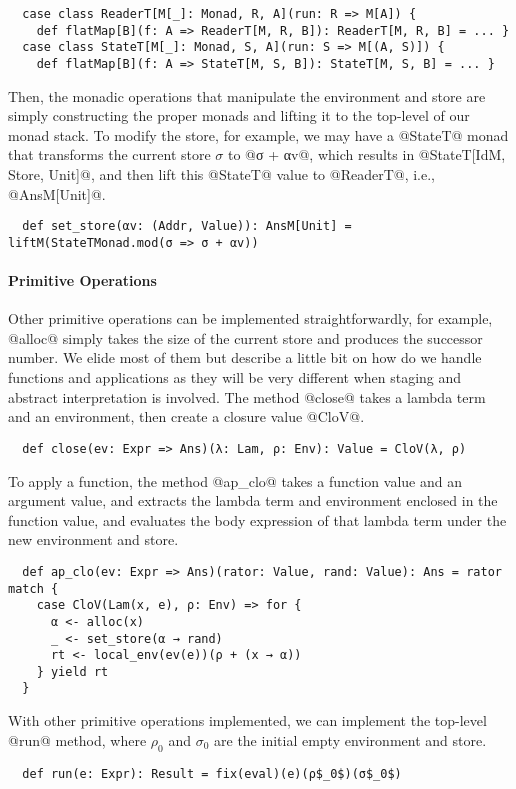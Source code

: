 \begin{lstlisting}
  case class ReaderT[M[_]: Monad, R, A](run: R => M[A]) {
    def flatMap[B](f: A => ReaderT[M, R, B]): ReaderT[M, R, B] = ... }
  case class StateT[M[_]: Monad, S, A](run: S => M[(A, S)]) {
    def flatMap[B](f: A => StateT[M, S, B]): StateT[M, S, B] = ... }
\end{lstlisting}

Then, the monadic operations that manipulate the environment and store are
simply constructing the proper monads and lifting it to the top-level of our
monad stack. To modify the store, for example, we may have a @StateT@ monad that
transforms the current store $\sigma$ to @σ + αv@, which results in
@StateT[IdM, Store, Unit]@, and then lift this @StateT@ value to @ReaderT@,
i.e., @AnsM[Unit]@.
\begin{lstlisting}
  def set_store(αv: (Addr, Value)): AnsM[Unit] = liftM(StateTMonad.mod(σ => σ + αv))
\end{lstlisting}

\paragraph{Primitive Operations}
Other primitive operations can be implemented straightforwardly, for example,
@alloc@ simply takes the size of the current store and produces the successor number.
We elide most of them but describe a little bit on how do we handle functions
and applications as they will be very different when staging and abstract
interpretation is involved. The method @close@ takes a lambda term and an
environment, then create a closure value @CloV@.

\begin{lstlisting}
  def close(ev: Expr => Ans)(λ: Lam, ρ: Env): Value = CloV(λ, ρ)
\end{lstlisting}

To apply a function, the method @ap_clo@ takes a function value and an argument
value, and extracts the lambda term and environment enclosed in the function value,
and evaluates the body expression of that lambda term under the new environment and store.

\begin{lstlisting}
  def ap_clo(ev: Expr => Ans)(rator: Value, rand: Value): Ans = rator match {
    case CloV(Lam(x, e), ρ: Env) => for {
      α <- alloc(x)
      _ <- set_store(α → rand)
      rt <- local_env(ev(e))(ρ + (x → α))
    } yield rt
  }
\end{lstlisting}

With other primitive operations implemented, we can implement the top-level
@run@ method, where $\rho_0$ and $\sigma_0$ are the initial empty environment and
store.

\begin{lstlisting}
  def run(e: Expr): Result = fix(eval)(e)(ρ$_0$)(σ$_0$)
\end{lstlisting}

